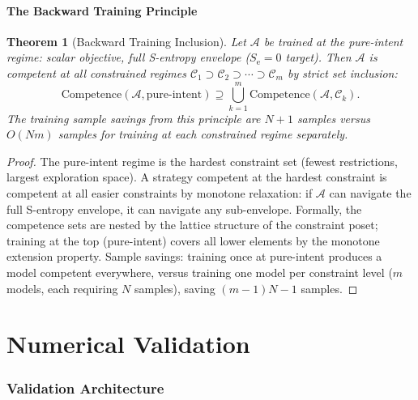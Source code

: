 \documentclass[twocolumn,11pt,a4paper]{article}
\theoremstyle{plain}
\newtheorem{theorem}{Theorem}[section]
\theoremstyle{definition}
\theoremstyle{remark}
\newcommand{\Se}{S_{\mathrm{e}}}
\begin{document}
\subsection{The Backward Training Principle}

\begin{theorem}[Backward Training Inclusion]
\label{thm:backward_training}
Let $\mathcal{A}$ be trained at the \emph{pure-intent regime}: scalar objective, full S-entropy envelope ($\Se = 0$ target).  Then $\mathcal{A}$ is competent at all constrained regimes $\mathcal{C}_1 \supset \mathcal{C}_2 \supset \cdots \supset \mathcal{C}_m$ by strict set inclusion:
\begin{equation}
  \text{Competence}(\mathcal{A}, \text{pure-intent}) \supseteq \bigcup_{k=1}^m \text{Competence}(\mathcal{A}, \mathcal{C}_k).
\end{equation}
The training sample savings from this principle are $N+1$ samples versus $O(Nm)$ samples for training at each constrained regime separately.
\end{theorem}

\begin{proof}
The pure-intent regime is the hardest constraint set (fewest restrictions, largest exploration space).  A strategy competent at the hardest constraint is competent at all easier constraints by monotone relaxation: if $\mathcal{A}$ can navigate the full S-entropy envelope, it can navigate any sub-envelope.  Formally, the competence sets are nested by the lattice structure of the constraint poset; training at the top (pure-intent) covers all lower elements by the monotone extension property.  Sample savings: training once at pure-intent produces a model competent everywhere, versus training one model per constraint level ($m$ models, each requiring $N$ samples), saving $(m-1)N - 1$ samples.
\end{proof}

\part{Numerical Validation}

\section{Validation Architecture}
\label{sec:validation}
\end{document}
